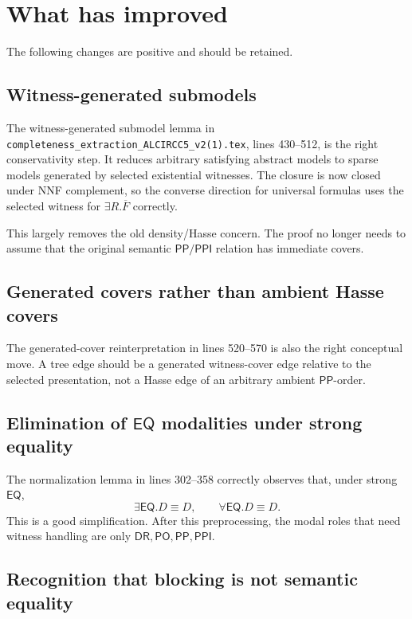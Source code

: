 \documentclass[11pt]{article}
\newcommand{\DR}{\mathsf{DR}}
\newcommand{\PO}{\mathsf{PO}}
\newcommand{\PP}{\mathsf{PP}}
\newcommand{\PPI}{\mathsf{PPI}}
\newcommand{\EQ}{\mathsf{EQ}}
\begin{document}
\section{What has improved}

The following changes are positive and should be retained.

\subsection{Witness-generated submodels}

The witness-generated submodel lemma in
\texttt{completeness\_extraction\_ALCIRCC5\_v2(1).tex}, lines 430--512, is the
right conservativity step.  It reduces arbitrary satisfying abstract models to
sparse models generated by selected existential witnesses.  The closure is now
closed under NNF complement, so the converse direction for universal formulas
uses the selected witness for \(\exists R.\overline F\) correctly.

This largely removes the old density/Hasse concern.  The proof no longer needs
to assume that the original semantic \(\PP/\PPI\) relation has immediate covers.

\subsection{Generated covers rather than ambient Hasse covers}

The generated-cover reinterpretation in lines 520--570 is also the right
conceptual move.  A tree edge should be a generated witness-cover edge relative
to the selected presentation, not a Hasse edge of an arbitrary ambient
\(\PP\)-order.

\subsection{Elimination of $\EQ$ modalities under strong equality}

The normalization lemma in lines 302--358 correctly observes that, under strong
\(\EQ\),
\[
\exists\EQ.D \equiv D,\qquad \forall\EQ.D \equiv D.
\]
This is a good simplification.  After this preprocessing, the modal roles that
need witness handling are only
\(\DR,\PO,\PP,\PPI\).

\subsection{Recognition that blocking is not semantic equality}
\end{document}
